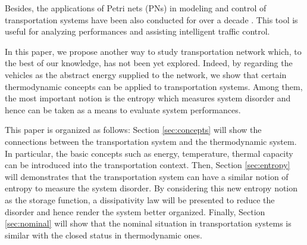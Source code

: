 \documentclass[preprint,authoryear,12pt]{elsarticle}
\begin{document}
Besides, the applications of Petri nets (PNs) in modeling and control of transportation systems have been also conducted for over a decade \citep{ng_review_2013}. This tool is useful for analyzing performances and assisting intelligent traffic control.

In this paper, we propose another way to study transportation network which, to the best of  our knowledge,  has not been yet explored. Indeed, by regarding the  vehicles as the abstract energy supplied to the network, we show that certain  thermodynamic concepts can be applied to transportation systems. Among them, the most important notion is the entropy which measures system disorder and hence can be taken as a means to evaluate system performances.

This paper is organized as follows: Section \ref{sec:concepts} will show the connections between the transportation system and the thermodynamic system. In particular, the basic concepts such as energy, temperature, thermal capacity can be introduced into the transportation context. Then, Section \ref{sec:entropy} will demonstrates that the transportation system can have a similar notion of entropy to measure the system disorder. By considering this new entropy notion as the storage function, a dissipativity law will be presented to reduce the disorder and hence render the system better organized. Finally, Section \ref{sec:nominal} will show that the nominal situation in transportation systems is similar with the closed status in thermodynamic ones.
\end{document}
